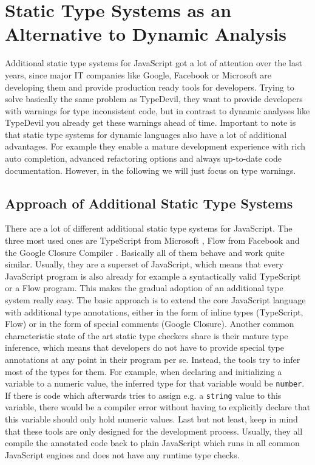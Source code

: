 \documentclass[runningheads,a4paper]{llncs}
\begin{document}
\section{Static Type Systems as an Alternative to Dynamic Analysis}

Additional static type systems for JavaScript got a lot of attention over the last years, since major IT companies like Google, Facebook or Microsoft are developing them and provide production ready tools for developers.
Trying to solve basically the same problem as TypeDevil, they want to provide developers with warnings for type inconsistent code, but in contrast to dynamic analyses like TypeDevil you already get these warnings ahead of time.
Important to note is that static type systems for dynamic languages also have a lot of additional advantages.
For example they enable a mature development experience with rich auto completion, advanced refactoring options and always up-to-date code documentation.
However, in the following we will just focus on type warnings.

\subsection{Approach of Additional Static Type Systems} \label{staticTypeSystems}
There are a lot of different additional static type systems for JavaScript.
The three most used ones are TypeScript from Microsoft \cite{TypeScript}, Flow from Facebook \cite{Flow} and the Google Closure Compiler \cite{ClosureComiler}.
Basically all of them behave and work quite similar.
Usually, they are a superset of JavaScript, which means that every JavaScript program is also already for example a syntactically valid TypeScript or a Flow program.
This makes the gradual adoption of an additional type system really easy.
The basic approach is to extend the core JavaScript language with additional type annotations, either in the form of inline types (TypeScript, Flow) or in the form of special comments (Google Closure).
Another common characteristic state of the art static type checkers share is their mature type inference, which means that developers do not have to provide special type annotations at any point in their program per se.
Instead, the tools try to infer most of the types for them. 
For example, when declaring and initializing a variable to a numeric value, the inferred type for that variable would be \lstinline[columns=fixed]{number}.
If there is code which afterwards tries to assign e.g. a \lstinline[columns=fixed]{string} value to this variable, there would be a compiler error without having to explicitly declare that this variable should only hold numeric values.
Last but not least, keep in mind that these tools are only designed for the development process.
Usually, they all compile the annotated code back to plain JavaScript which runs in all common JavaScript engines and does not have any runtime type checks.
\end{document}
